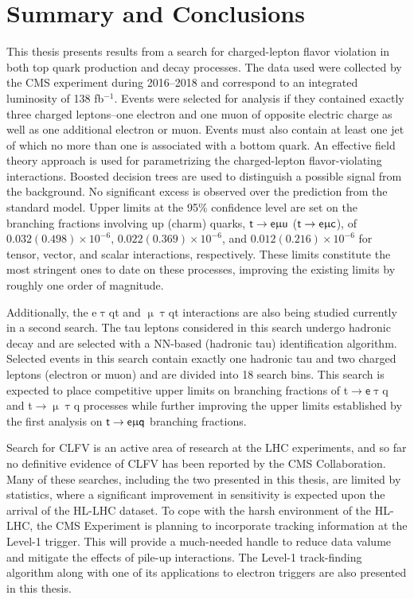 \chapter*{Summary and Conclusions}
\label{chap:Conclusion}

This thesis presents results from a search for charged-lepton flavor violation in both top quark production and decay processes. The data used were collected by the \ac{CMS} experiment during 2016--2018 and correspond to an integrated luminosity of 138 fb$^{-1}$. Events were selected for analysis if they contained exactly three charged leptons--one electron and one muon of opposite electric charge as well as one additional electron or muon. Events must also contain at least one jet of which no more than one is associated with a bottom quark. An effective field theory approach is used for parametrizing the charged-lepton flavor-violating interactions. Boosted decision trees are used to distinguish a possible signal from the background. No significant excess is observed over the prediction from the standard model. Upper limits at the 95\% confidence level are set on the branching fractions involving up (charm) quarks, $\textsf{t}\rightarrow\textsf{e}\upmu\textsf{u}$ ($\textsf{t}\rightarrow\textsf{e}\upmu\textsf{c}$), of $0.032 (0.498) \times 10^{-6}$, $0.022 (0.369) \times 10^{-6}$, and $0.012 (0.216) \times 10^{-6}$ for tensor, vector, and scalar interactions, respectively. These limits constitute the most stringent ones to date on these processes, improving the existing limits by roughly one order of magnitude.

Additionally, the e$\uptau$qt and $\upmu\uptau$qt interactions are also being studied currently in a second search. The tau leptons considered in this search undergo hadronic decay and are selected with a \ac{NN}-based (hadronic tau) identification algorithm. Selected events in this search contain exactly one hadronic tau and two charged leptons (electron or muon) and are divided into 18 search bins. This search is expected to place competitive upper limits on branching fractions of t$\rightarrow\textsf{e}\uptau$q and t$\rightarrow\upmu\uptau$q processes while further improving the upper limits established by the first analysis on $\textsf{t}\rightarrow\textsf{e}\upmu\textsf{q}$ branching fractions. 

Search for \ac{CLFV} is an active area of research at the \ac{LHC} experiments, and so far no definitive evidence of \ac{CLFV} has been reported by the \ac{CMS} Collaboration. Many of these searches, including the two presented in this thesis, are limited by statistics, where a significant improvement in sensitivity is expected upon the arrival of the \ac{HL-LHC} dataset. To cope with the harsh environment of the \ac{HL-LHC}, the \ac{CMS} Experiment is planning to incorporate tracking information at the Level-1 trigger. This will provide a much-needed handle to reduce data valume and mitigate the effects of pile-up interactions. The Level-1 track-finding algorithm along with one of its applications to electron triggers are also presented in this thesis.